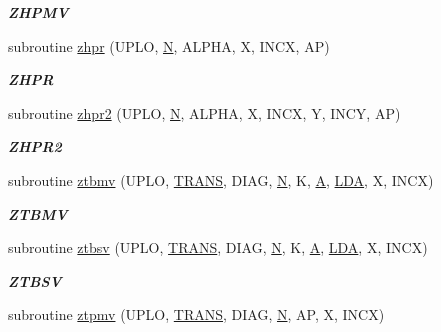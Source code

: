 \begin{DoxyCompactItemize}
\begin{DoxyCompactList}\small\item\em {\bfseries Z\+H\+P\+M\+V} \end{DoxyCompactList}\item 
subroutine \hyperlink{group__complex16__blas__level2_ga449f8a34be469eab7caf327caa086711}{zhpr} (U\+P\+L\+O, \hyperlink{polmisc_8c_a0240ac851181b84ac374872dc5434ee4}{N}, A\+L\+P\+H\+A, X, I\+N\+C\+X, A\+P)
\begin{DoxyCompactList}\small\item\em {\bfseries Z\+H\+P\+R} \end{DoxyCompactList}\item 
subroutine \hyperlink{group__complex16__blas__level2_ga44a6afc0e18dc1b5d50bf12b79129843}{zhpr2} (U\+P\+L\+O, \hyperlink{polmisc_8c_a0240ac851181b84ac374872dc5434ee4}{N}, A\+L\+P\+H\+A, X, I\+N\+C\+X, Y, I\+N\+C\+Y, A\+P)
\begin{DoxyCompactList}\small\item\em {\bfseries Z\+H\+P\+R2} \end{DoxyCompactList}\item 
subroutine \hyperlink{group__complex16__blas__level2_ga2eb62f52e98a997e5f88f86d53cd0d4f}{ztbmv} (U\+P\+L\+O, \hyperlink{superlu__enum__consts_8h_a0c4e17b2d5cea33f9991ccc6a6678d62a1f61e3015bfe0f0c2c3fda4c5a0cdf58}{T\+R\+A\+N\+S}, D\+I\+A\+G, \hyperlink{polmisc_8c_a0240ac851181b84ac374872dc5434ee4}{N}, K, \hyperlink{classA}{A}, \hyperlink{example__user_8c_ae946da542ce0db94dced19b2ecefd1aa}{L\+D\+A}, X, I\+N\+C\+X)
\begin{DoxyCompactList}\small\item\em {\bfseries Z\+T\+B\+M\+V} \end{DoxyCompactList}\item 
subroutine \hyperlink{group__complex16__blas__level2_ga20d3fa0fe7cc708608dc658c743bfcab}{ztbsv} (U\+P\+L\+O, \hyperlink{superlu__enum__consts_8h_a0c4e17b2d5cea33f9991ccc6a6678d62a1f61e3015bfe0f0c2c3fda4c5a0cdf58}{T\+R\+A\+N\+S}, D\+I\+A\+G, \hyperlink{polmisc_8c_a0240ac851181b84ac374872dc5434ee4}{N}, K, \hyperlink{classA}{A}, \hyperlink{example__user_8c_ae946da542ce0db94dced19b2ecefd1aa}{L\+D\+A}, X, I\+N\+C\+X)
\begin{DoxyCompactList}\small\item\em {\bfseries Z\+T\+B\+S\+V} \end{DoxyCompactList}\item 
subroutine \hyperlink{group__complex16__blas__level2_gaed33e3470ec372c730960b6038d1e037}{ztpmv} (U\+P\+L\+O, \hyperlink{superlu__enum__consts_8h_a0c4e17b2d5cea33f9991ccc6a6678d62a1f61e3015bfe0f0c2c3fda4c5a0cdf58}{T\+R\+A\+N\+S}, D\+I\+A\+G, \hyperlink{polmisc_8c_a0240ac851181b84ac374872dc5434ee4}{N}, A\+P, X, I\+N\+C\+X)

\end{DoxyCompactItemize}
